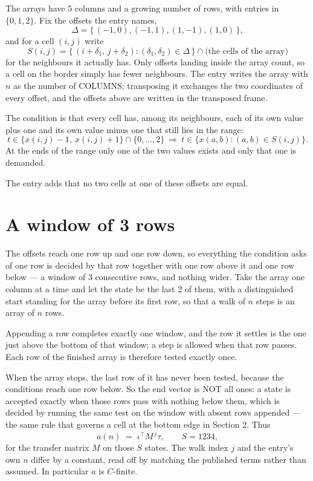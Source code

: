\documentclass[11pt,a4paper]{article}
\theoremstyle{plain}
\theoremstyle{definition}
\begin{document}
The arrays have $5$ columns and a growing number of rows, with entries in $\{0,1,2\}$. Fix the
offsets the entry names,
\[
\Delta=\{\,(-1,0), (-1,1), (1,-1), (1,0)\,\},
\]
and for a cell $(i,j)$ write
\[
S(i,j)=\{\,(i+\delta_1,\,j+\delta_2) : (\delta_1,\delta_2)\in\Delta\,\}\cap
\text{(the cells of the array)}
\]
for the neighbours it actually has. Only offsets landing inside the array count, so a cell on
the border simply has fewer neighbours. The entry writes the array with $n$ as the number of COLUMNS; transposing it exchanges the two coordinates of every offset, and the offsets above are written in the transposed frame.

The condition is that every cell has, among its neighbours, each of its own value plus one and its own value minus one that still lies in the range:
\[
t\in\{x(i,j)-1,\ x(i,j)+1\}\cap\{0,\dots,2\}\ \Longrightarrow\ t\in\{x(a,b):(a,b)\in S(i,j)\}.
\]
At the ends of the range only one of the two values exists and only that one is demanded.

The entry adds that no two cells at one of these offsets are equal.

\section{A window of 3 rows}

The offsets reach one row up and one row down, so everything the condition asks of one row is
decided by that row together with one row above it and one row below --- a window of
$3$ consecutive rows, and nothing wider. Take the array one column at a time and
let the state be the last 2 of them, with a distinguished start standing for the array before its
first row, so that a walk of $n$ steps is an array of $n$ rows.

Appending a row completes exactly one window, and the row it settles is the one just above the bottom of that window; a step is
allowed when that row passes. Each row of the finished array is therefore tested exactly once.

When the array stops, the last row of it has never been tested, because the
conditions reach one row below. So the end vector is NOT all ones: a state is accepted exactly when
those rows pass with nothing below them, which is decided by running the same test on the window
with absent rows appended --- the same rule that governs a cell at the bottom edge in
Section 2.
Thus
\[
a(n)\;=\;\iota^{\!\top}M^{\,j}\tau ,\qquad S=1234,
\]
for the transfer matrix $M$ on those $S$ states. The walk index $j$ and the entry's own $n$
differ by a constant, read off by matching the published terms rather than assumed. In
particular $a$ is $C$-finite.
\end{document}
